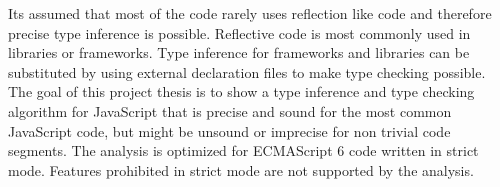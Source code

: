 Its assumed that most of the code rarely uses reflection like code and therefore precise type inference is possible. Reflective code is most commonly used in libraries or frameworks. Type inference for frameworks and libraries can be substituted by using external declaration files to make type checking possible. The goal of this project thesis is to show a type inference and type checking algorithm for JavaScript that is precise and sound for the most common JavaScript code, but might be unsound or imprecise for non trivial code segments. The analysis is optimized for ECMAScript 6 code written in strict mode. Features prohibited in strict mode are not supported by the analysis.

